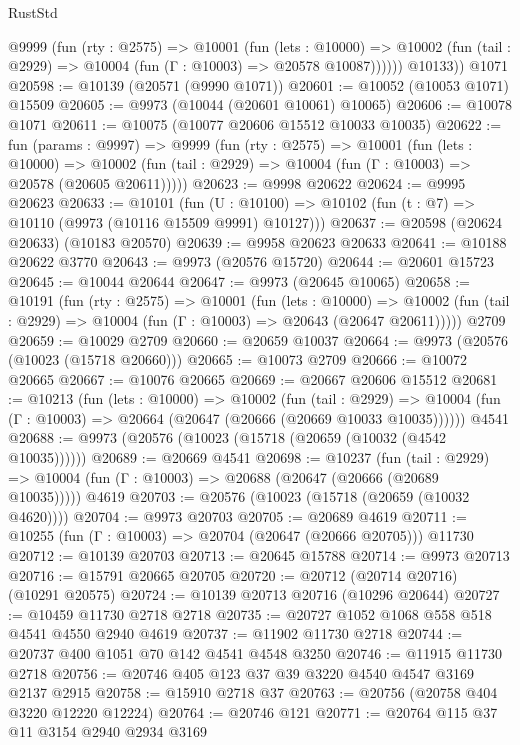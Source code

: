 \begin{lexlean}{RustStd}
\begin{coremodule}
          @9999
            (fun (rty : @2575) =>
            @10001
              (fun (lets : @10000) =>
              @10002 (fun (tail : @2929) => @10004 (fun (Γ : @10003) => @20578 @10087))))))
        @10133))
    @1071
@20598 := @10139 (@20571 (@9990 @1071))
@20601 := @10052 (@10053 @1071) @15509
@20605 := @9973 (@10044 (@20601 @10061) @10065)
@20606 := @10078 @1071
@20611 := @10075 (@10077 @20606 @15512 @10033 @10035)
@20622 := fun (params : @9997) =>
  @9999
    (fun (rty : @2575) =>
    @10001
      (fun (lets : @10000) =>
      @10002 (fun (tail : @2929) => @10004 (fun (Γ : @10003) => @20578 (@20605 @20611)))))
@20623 := @9998 @20622
@20624 := @9995 @20623
@20633 := @10101
    (fun (U : @10100) => @10102 (fun (t : @7) => @10110 (@9973 (@10116 @15509 @9991) @10127)))
@20637 := @20598 (@20624 @20633) (@10183 @20570)
@20639 := @9958 @20623 @20633
@20641 := @10188 @20622 @3770
@20643 := @9973 (@20576 @15720)
@20644 := @20601 @15723
@20645 := @10044 @20644
@20647 := @9973 (@20645 @10065)
@20658 := @10191
    (fun (rty : @2575) =>
    @10001
      (fun (lets : @10000) =>
      @10002 (fun (tail : @2929) => @10004 (fun (Γ : @10003) => @20643 (@20647 @20611)))))
    @2709
@20659 := @10029 @2709
@20660 := @20659 @10037
@20664 := @9973 (@20576 (@10023 (@15718 @20660)))
@20665 := @10073 @2709
@20666 := @10072 @20665
@20667 := @10076 @20665
@20669 := @20667 @20606 @15512
@20681 := @10213
    (fun (lets : @10000) =>
    @10002
      (fun (tail : @2929) =>
      @10004 (fun (Γ : @10003) => @20664 (@20647 (@20666 (@20669 @10033 @10035))))))
    @4541
@20688 := @9973 (@20576 (@10023 (@15718 (@20659 (@10032 (@4542 @10035))))))
@20689 := @20669 @4541
@20698 := @10237
    (fun (tail : @2929) => @10004 (fun (Γ : @10003) => @20688 (@20647 (@20666 (@20689 @10035)))))
    @4619
@20703 := @20576 (@10023 (@15718 (@20659 (@10032 @4620))))
@20704 := @9973 @20703
@20705 := @20689 @4619
@20711 := @10255 (fun (Γ : @10003) => @20704 (@20647 (@20666 @20705))) @11730
@20712 := @10139 @20703
@20713 := @20645 @15788
@20714 := @9973 @20713
@20716 := @15791 @20665 @20705
@20720 := @20712 (@20714 @20716) (@10291 @20575)
@20724 := @10139 @20713 @20716 (@10296 @20644)
@20727 := @10459 @11730 @2718 @2718
@20735 := @20727 @1052 @1068 @558 @518 @4541 @4550 @2940 @4619
@20737 := @11902 @11730 @2718
@20744 := @20737 @400 @1051 @70 @142 @4541 @4548 @3250
@20746 := @11915 @11730 @2718
@20756 := @20746 @405 @123 @37 @39 @3220 @4540 @4547 @3169 @2137 @2915
@20758 := @15910 @2718 @37
@20763 := @20756 (@20758 @404 @3220 @12220 @12224)
@20764 := @20746 @121
@20771 := @20764 @115 @37 @11 @3154 @2940 @2934 @3169

\end{coremodule}
\end{lexlean}
